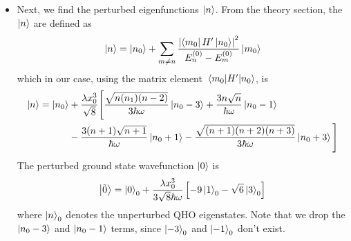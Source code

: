\documentclass[11pt, a4paper]{article}
\newcommand{\Ham}{Hamiltonian\xspace}
\renewcommand{\t}[1]{\tilde{#1}}
\begin{document}
\begin{itemize}
	Next, we substitute in the energy differences (e.g. $ E^{(0)}_{n} - E^{(0)}_{n-3} = 3\hbar \omega$) in the denominators, which are known from the unperturbed \Ham $ H_{0} $, where the energies are equally spaced by $ \hbar \omega $. Substituting in energies and factoring out $ \hbar \omega $ gives
	\begin{align*}
		E_{n} &= E^{(0)}_{n} + \frac{\lambda^{2} x_{0}^{6}}{24 \hbar \omega}\left[n(n-1)(n-2) + 27n^{3} - 27(n+1)^{3} - (n+1)(n+2)(n+3) \right]\\
		& = E^{(0)}_{n} + \frac{\lambda^{2} x_{0}^{6}}{24 \hbar \omega} \left(n^{3}-3n^{2} + 2n + 27n^{3} - 27n^{3} - 81n^{2} - 81n - 27 - n^{3} - 6n^{2} - 11n - 6\right)\\
		&=E^{(0)}_{n} - \frac{\lambda^{2} x_{0}^{6}}{24 \hbar \omega} \left(90n^{2} + 90n + 33\right)\\
		&=E^{(0)}_{n} - \frac{\lambda^{2} x_{0}^{6}}{8 \hbar \omega} \left(30n^{2} + 30n + 11\right)
	\end{align*}
	Note that the energy correction is negative---the perturbed energies $ E_{n} $ are lower than the standard QHO energies $ E^{(0)}_{n} $.
	
	\item Next, we find the perturbed eigenfunctions $ \ket{n} $. From the theory section, the $ \ket{n} $ are defined as
	\begin{equation*}
		\ket{n} = \ket{n_{0}} + \sum_{m\neq n}\frac{\abs{\bra{m_{0}}H'\ket{n_{0}}}^{2}}{E^{(0)}_{n}-E^{(0)}_{m}} \ket{m_{0}}
	\end{equation*}
	which in our case, using the matrix element $ \mel{m_{0}}{H'}{n_{0}}  $, is
	\begin{align*}
		\ket{n} =
		\ket{n_{0}} &+ \frac{\lambda x_{0}^{3}}{\sqrt{8}}\Bigg[\frac{\sqrt{n(n_1)(n-2)}}{3\hbar \omega}\ket{n_{0}-3} + \frac{3n\sqrt{n}}{\hbar \omega}\ket{n_{0}-1} \\
		&- \frac{3(n+1)\sqrt{n+1}}{\hbar \omega}\ket{n_{0}+1} - \frac{\sqrt{(n+1)(n+2)(n+3)}}{3\hbar \omega}\ket{n_{0}+3}\Bigg]
	\end{align*}
	The perturbed ground state wavefunction $ \ket{0} $ is
	\begin{equation*}
		\ket{\t{0}} = \ket{0}_{0} + \frac{\lambda x_{0}^{3}}{3\sqrt{8}\hbar\omega}\left[-9\ket{1}_{0} - \sqrt{6}\ket{3}_{0}\right]
	\end{equation*}
	where $ \ket{n}_{0} $ denotes the unperturbed QHO eigenstates. Note that we drop the $ \ket{n_{0}-3} $ and $ \ket{n_{0}-1} $ terms, since $ \ket{-3}_{0} $ and $ \ket{-1}_{0} $ don't exist.
	

\end{itemize}
\end{document}
